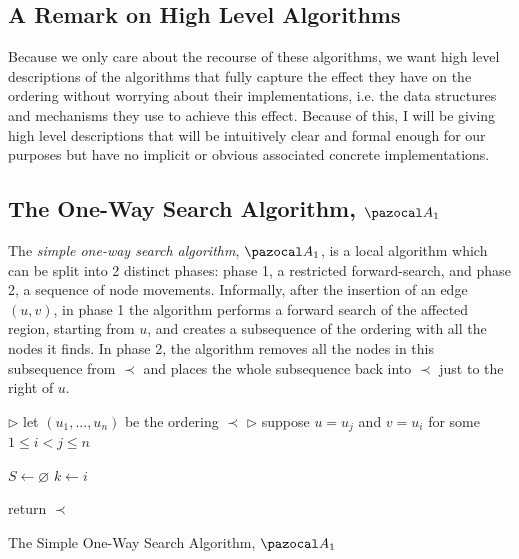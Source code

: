 \documentclass{report}
\begin{document}
\subsection{A Remark on High Level Algorithms}

Because we only care about the recourse of these algorithms, we want high level descriptions of the algorithms that fully capture the effect they have on the ordering without worrying about their implementations, i.e. the data structures and mechanisms they use to achieve this effect. Because of this, I will be giving high level descriptions that will be intuitively clear and formal enough for our purposes but have no implicit or obvious associated concrete implementations.

\subsection{The One-Way Search Algorithm, $\pazocal A_1$}

The \textit{simple one-way search algorithm}, $\pazocal A_1$, is a local algorithm which can be split into 2 distinct phases: phase 1, a restricted forward-search, and phase 2, a sequence of node movements. Informally, after the insertion of an edge $(u,v)$, in phase 1 the algorithm performs a forward search of the affected region, starting from $u$, and creates a subsequence of the ordering with all the nodes it finds. In phase 2, the algorithm removes all the nodes in this subsequence from $\prec$ and places the whole subsequence back into $\prec$ just to the right of $u$.

\begin{algorithm}[H]\label{oneway}
    \SetAlgoLined
    
    
    $\triangleright$ let $(u_1,...,u_n)$ be the ordering $\prec$\;
    $\triangleright$ suppose $u = u_j$ and $v=u_i$ for some $1 \leq i < j \leq n$\;
    
    $S \leftarrow \varnothing$\;
    $k \leftarrow i$\;
    
    
    return $\prec$\;
    \caption{The Simple One-Way Search Algorithm, $\pazocal A_1$}
\end{algorithm}
\end{document}
